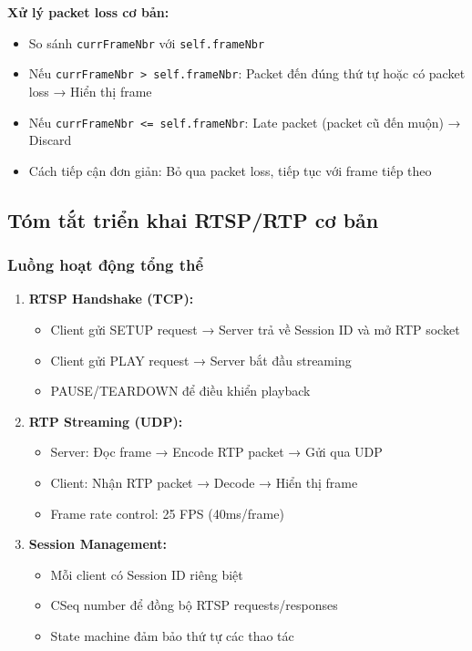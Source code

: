 \documentclass[a4paper,12pt]{article}
\begin{document}
\textbf{Xử lý packet loss cơ bản:}
\begin{itemize}
    \item So sánh \texttt{currFrameNbr} với \texttt{self.frameNbr}
    \item Nếu \texttt{currFrameNbr > self.frameNbr}: Packet đến đúng thứ tự hoặc có packet loss → Hiển thị frame
    \item Nếu \texttt{currFrameNbr <= self.frameNbr}: Late packet (packet cũ đến muộn) → Discard
    \item Cách tiếp cận đơn giản: Bỏ qua packet loss, tiếp tục với frame tiếp theo
\end{itemize}

\subsection{Tóm tắt triển khai RTSP/RTP cơ bản}

\subsubsection{Luồng hoạt động tổng thể}

\begin{enumerate}
    \item \textbf{RTSP Handshake (TCP):}
    \begin{itemize}
        \item Client gửi SETUP request → Server trả về Session ID và mở RTP socket
        \item Client gửi PLAY request → Server bắt đầu streaming
        \item PAUSE/TEARDOWN để điều khiển playback
    \end{itemize}
    
    \item \textbf{RTP Streaming (UDP):}
    \begin{itemize}
        \item Server: Đọc frame → Encode RTP packet → Gửi qua UDP
        \item Client: Nhận RTP packet → Decode → Hiển thị frame
        \item Frame rate control: 25 FPS (40ms/frame)
    \end{itemize}
    
    \item \textbf{Session Management:}
    \begin{itemize}
        \item Mỗi client có Session ID riêng biệt
        \item CSeq number để đồng bộ RTSP requests/responses
        \item State machine đảm bảo thứ tự các thao tác
    \end{itemize}
\end{enumerate}
\end{document}
